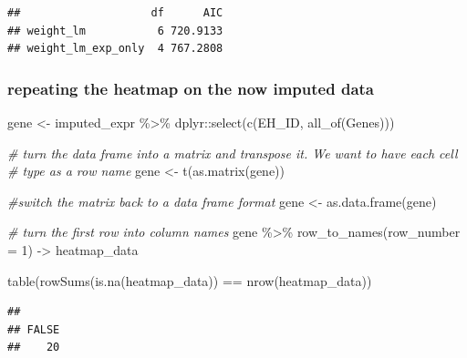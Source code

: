 \documentclass[
]{article}
\newenvironment{Shaded}{\begin{snugshade}}{\end{snugshade}}
\newcommand{\AttributeTok}[1]{\textcolor[rgb]{0.77,0.63,0.00}{#1}}
\newcommand{\CommentTok}[1]{\textcolor[rgb]{0.56,0.35,0.01}{\textit{#1}}}
\newcommand{\DecValTok}[1]{\textcolor[rgb]{0.00,0.00,0.81}{#1}}
\newcommand{\FunctionTok}[1]{\textcolor[rgb]{0.00,0.00,0.00}{#1}}
\newcommand{\NormalTok}[1]{#1}
\newcommand{\OtherTok}[1]{\textcolor[rgb]{0.56,0.35,0.01}{#1}}
\newcommand{\SpecialCharTok}[1]{\textcolor[rgb]{0.00,0.00,0.00}{#1}}
\begin{document}
\begin{verbatim}
##                    df      AIC
## weight_lm           6 720.9133
## weight_lm_exp_only  4 767.2808
\end{verbatim}

\hypertarget{repeating-the-heatmap-on-the-now-imputed-data}{%
\subsubsection{repeating the heatmap on the now imputed
data}\label{repeating-the-heatmap-on-the-now-imputed-data}}

\begin{Shaded}
\begin{Highlighting}[]
\NormalTok{gene }\OtherTok{\textless{}{-}}\NormalTok{ imputed\_expr }\SpecialCharTok{\%\textgreater{}\%}\NormalTok{ dplyr}\SpecialCharTok{::}\FunctionTok{select}\NormalTok{(}\FunctionTok{c}\NormalTok{(EH\_ID, }\FunctionTok{all\_of}\NormalTok{(Genes)))}
 
 \CommentTok{\# turn the data frame into a matrix and transpose it. We want to have each cell }
 \CommentTok{\# type as a row name }
\NormalTok{ gene }\OtherTok{\textless{}{-}} \FunctionTok{t}\NormalTok{(}\FunctionTok{as.matrix}\NormalTok{(gene))}
 
 \CommentTok{\#switch the matrix back to a data frame format}
\NormalTok{ gene }\OtherTok{\textless{}{-}} \FunctionTok{as.data.frame}\NormalTok{(gene)}
 
 \CommentTok{\# turn the first row into column names}
\NormalTok{ gene }\SpecialCharTok{\%\textgreater{}\%}
     \FunctionTok{row\_to\_names}\NormalTok{(}\AttributeTok{row\_number =} \DecValTok{1}\NormalTok{) }\OtherTok{{-}\textgreater{}}\NormalTok{ heatmap\_data}
 
 
 \FunctionTok{table}\NormalTok{(}\FunctionTok{rowSums}\NormalTok{(}\FunctionTok{is.na}\NormalTok{(heatmap\_data)) }\SpecialCharTok{==} \FunctionTok{nrow}\NormalTok{(heatmap\_data))}
\end{Highlighting}
\end{Shaded}

\begin{verbatim}
## 
## FALSE 
##    20
\end{verbatim}
\end{document}
